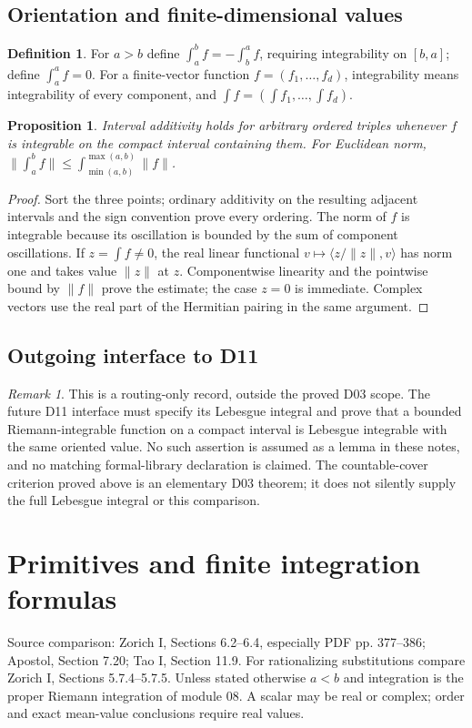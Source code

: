 \documentclass[11pt,oneside,a4paper]{book}
\newtheorem{proposition}[theorem]{Proposition}
\theoremstyle{definition}
\newtheorem{definition}[theorem]{Definition}
\theoremstyle{remark}
\newtheorem{remark}[theorem]{Remark}
\newcommand{\KEntry}[2]{\Needspace{7\baselineskip}\section{#2}\label{#1}{\small\sffamily\color{black!60}\detokenize{#1}}\par}
\newcommand{\SourceRef}[1]{{\small\textsf{Source comparison: #1.}}}
\begin{document}
\KEntry{K03.08.oriented}{Orientation and finite-dimensional values}
\begin{definition}
For $a>b$ define $\int_a^bf=-\int_b^af$, requiring integrability on
$[b,a]$; define $\int_a^af=0$. For a finite-vector function
$f=(f_1,\ldots,f_d)$, integrability means integrability of every component,
and $\int f=(\int f_1,\ldots,\int f_d)$.
\end{definition}
\begin{proposition}
Interval additivity holds for arbitrary ordered triples whenever $f$ is
integrable on the compact interval containing them. For Euclidean norm,
$\|\int_a^bf\|\le\int_{\min(a,b)}^{\max(a,b)}\|f\|$.
\end{proposition}
\begin{proof}
Sort the three points; ordinary additivity on the resulting adjacent
intervals and the sign convention prove every ordering. The norm of $f$
is integrable because its oscillation is bounded by the sum of component
oscillations. If $z=\int f\ne0$, the real linear functional
$v\mapsto\langle z/\|z\|,v\rangle$ has norm one and takes value
$\|z\|$ at $z$. Componentwise linearity and the pointwise bound by
$\|f\|$ prove the estimate; the case $z=0$ is immediate. Complex
vectors use the real part of the Hermitian pairing in the same argument.
\end{proof}

\KEntry{K03.08.bridge_lebesgue}{Outgoing interface to D11}
\begin{remark}
This is a routing-only record, outside the proved D03 scope. The future
D11 interface must specify its Lebesgue integral and prove that a bounded
Riemann-integrable function on a compact interval is Lebesgue integrable
with the same oriented value. No such assertion is assumed as a lemma
in these notes, and no matching formal-library declaration is claimed.
The countable-cover criterion proved above is an elementary D03 theorem;
it does not silently supply the full Lebesgue integral or this comparison.
\end{remark}

\chapter{Primitives and finite integration formulas}
\SourceRef{Zorich I, Sections 6.2--6.4, especially PDF pp. 377--386; Apostol, Section 7.20; Tao I, Section 11.9. For rationalizing substitutions compare Zorich I, Sections 5.7.4--5.7.5}
Unless stated otherwise $a<b$ and integration is the proper Riemann
integration of module 08. A scalar may be real or complex; order and exact
mean-value conclusions require real values.
\end{document}
